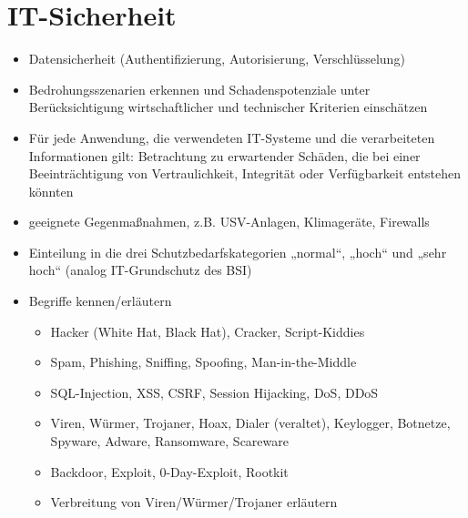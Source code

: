 \section{IT-Sicherheit}
\label{sec:IT-Sicherheit}


\begin{itemize}
	\item Datensicherheit (Authentifizierung, Autorisierung, Verschlüsselung)
	\item Bedrohungsszenarien erkennen und Schadenspotenziale unter Berücksichtigung wirtschaftlicher und technischer Kriterien einschätzen
	\item Für jede Anwendung, die verwendeten IT-Systeme und die verarbeiteten Informationen gilt: Betrachtung zu erwartender Schäden, die bei einer Beeinträchtigung von Vertraulichkeit, Integrität oder Verfügbarkeit entstehen könnten
	\item geeignete Gegenmaßnahmen, z.B. USV-Anlagen, Klimageräte, Firewalls
	\item Einteilung in die drei Schutzbedarfskategorien „normal“, „hoch“ und „sehr hoch“ (analog IT-Grundschutz des BSI)
	\item Begriffe kennen/erläutern
	\begin{itemize}
		\item Hacker (White Hat, Black Hat), Cracker, Script-Kiddies
		\item Spam, Phishing, Sniffing, Spoofing, Man-in-the-Middle
		\item SQL-Injection, XSS, CSRF, Session Hijacking, DoS, DDoS
		\item Viren, Würmer, Trojaner, Hoax, Dialer (veraltet), Keylogger, Botnetze, Spyware, Adware, Ransomware, Scareware
		\item Backdoor, Exploit, 0-Day-Exploit, Rootkit
		\item Verbreitung von Viren/Würmer/Trojaner erläutern
	\end{itemize}
	
\end{itemize}